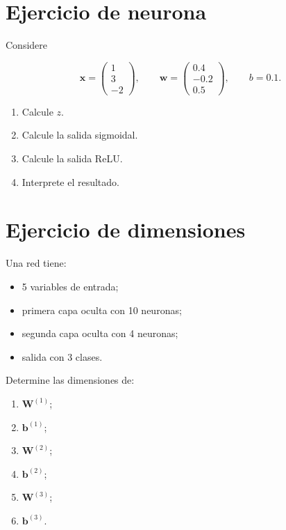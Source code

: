 \documentclass[
  spanish,
  10.5pt,
  letterpaper,
  DIV=11,
  numbers=noendperiod,
  oneside,
  open=any]{scrreprt}
\providecommand{\tightlist}{%
  \setlength{\itemsep}{0pt}\setlength{\parskip}{0pt}}
\theoremstyle{definition}
\theoremstyle{definition}
\theoremstyle{plain}
\theoremstyle{remark}
\begin{document}
\section*{Ejercicio de neurona}\label{ejercicio-de-neurona}


Considere

\[
\mathbf{x}
=
\begin{pmatrix}
1\\
3\\
-2
\end{pmatrix},
\qquad
\mathbf{w}
=
\begin{pmatrix}
0.4\\
-0.2\\
0.5
\end{pmatrix},
\qquad
b=0.1.
\]

\begin{enumerate}
\def\labelenumi{\arabic{enumi}.}
\tightlist
\item
  Calcule \(z\).
\item
  Calcule la salida sigmoidal.
\item
  Calcule la salida ReLU.
\item
  Interprete el resultado.
\end{enumerate}

\section*{Ejercicio de dimensiones}\label{ejercicio-de-dimensiones}


Una red tiene:

\begin{itemize}
\tightlist
\item
  5 variables de entrada;
\item
  primera capa oculta con 10 neuronas;
\item
  segunda capa oculta con 4 neuronas;
\item
  salida con 3 clases.
\end{itemize}

Determine las dimensiones de:

\begin{enumerate}
\def\labelenumi{\arabic{enumi}.}
\tightlist
\item
  \(\mathbf{W}^{(1)}\);
\item
  \(\mathbf{b}^{(1)}\);
\item
  \(\mathbf{W}^{(2)}\);
\item
  \(\mathbf{b}^{(2)}\);
\item
  \(\mathbf{W}^{(3)}\);
\item
  \(\mathbf{b}^{(3)}\).
\end{enumerate}
\end{document}
